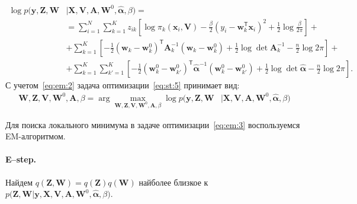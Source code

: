 \documentclass[12pt, twoside]{article}
\numberwithin{equation}{section}
\begin{document}
\begin{equation}
\label{eq:em:2}
\begin{aligned}
\log p\bigr(\mathbf{y}, \mathbf{Z}, \mathbf{W}&|\mathbf{X}, \mathbf{V}, \textbf{A}, \textbf{W}^{0}, \hat{\bm{\alpha}}, \beta\bigr) =\\
&= \sum_{i=1}^{N}\sum_{k=1}^{K}z_{ik}\left[\log\pi_k\left(\textbf{x}_i, \textbf{V}\right) - \frac{\beta}{2}\left(y_{i} - \textbf{w}_{k}^{\mathsf{T}}\textbf{x}_{i}\right)^{2} + \frac{1}{2}\log\frac{\beta}{2\pi}\right] +\\
&+ \sum_{k=1}^{K}\left[-\frac{1}{2}\left(\textbf{w}_{k} - \textbf{w}_{k}^{0}\right)^{\mathsf{T}}\textbf{A}_{k}^{-1}\left(\textbf{w}_{k} - \textbf{w}_{k}^{0}\right) + \frac{1}{2}\log\det\textbf{A}^{-1}_{k} - \frac{n}{2}\log2\pi\right]+\\
&+ \sum_{k=1}^{K}\sum_{k'=1}^{K}\left[-\frac{1}{2}\left(\textbf{w}_{k}^{0}-\textbf{w}_{k'}^{0}\right)^{\mathsf{T}}\hat{\bm{\alpha}}^{-1}\left(\textbf{w}_{k}^{0}-\textbf{w}_{k'}^{0}\right) +\frac{1}{2}\log\det\hat{\bm{\alpha}} -\frac{n}{2}\log{2\pi}\right].
\end{aligned}
\end{equation}
С учетом~\eqref{eq:em:2} задача оптимизации~\eqref{eq:st:5} принимает вид:
\begin{equation}
\label{eq:em:3}
\begin{aligned}
\mathbf{W}, \mathbf{Z}, \mathbf{V}, \mathbf{W}^0, \textbf{A},  \beta = \arg\max_{\mathbf{W}, \mathbf{Z}, \mathbf{V}, \mathbf{W}^0, \textbf{A}, \beta} \log p\bigr(\mathbf{y}, \mathbf{Z}, \mathbf{W}&|\mathbf{X}, \mathbf{V}, \textbf{A}, \textbf{W}^{0}, \hat{\bm{\alpha}}, \beta\bigr)
\end{aligned}
\end{equation}

Для поиска локального минимума в задаче оптимизации~\eqref{eq:em:3} воспользуемся EM-алгоритмом.

\paragraph{E--step.} Найдем $q\left(\mathbf{Z}, \mathbf{W}\right) = q\left(\mathbf{Z}\right)q\left(\mathbf{W}\right)$ найболее близкое к $p\bigr(\mathbf{Z}, \mathbf{W}|\mathbf{y}, \mathbf{X}, \mathbf{V}, \textbf{A}, \textbf{W}^{0}, \hat{\bm{\alpha}}, \beta\bigr)$.
\end{document}
